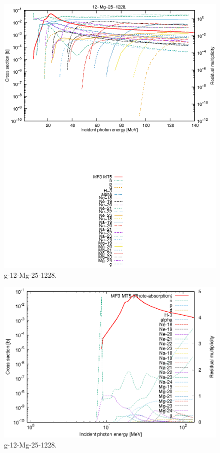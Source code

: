 \begin{figure}
 \includegraphics[width=\linewidth]{eps/g_12-Mg-25_1228.eps}
  \caption{g-12-Mg-25-1228.}
\end{figure}
\newpage \clearpage

\begin{figure}
 \includegraphics[width=\linewidth]{eps-log/g_12-Mg-25_1228.eps}
 \caption{g-12-Mg-25-1228.}
\end{figure}
\newpage \clearpage

